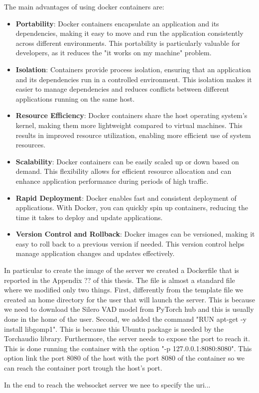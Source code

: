 \documentclass[../main.tex]{subfiles}
\begin{document}
The main advantages of using docker containers are:

\begin{itemize}
    \item \textbf{Portability}: Docker containers encapsulate an application and its dependencies, making it easy to move and run the application consistently across different environments. This portability is particularly valuable for developers, as it reduces the "it works on my machine" problem.
    \item \textbf{Isolation}: Containers provide process isolation, ensuring that an application and its dependencies run in a controlled environment. This isolation makes it easier to manage dependencies and reduces conflicts between different applications running on the same host.
    \item \textbf{Resource Efficiency}: Docker containers share the host operating system's kernel, making them more lightweight compared to virtual machines. This results in improved resource utilization, enabling more efficient use of system resources.
    \item \textbf{Scalability}: Docker containers can be easily scaled up or down based on demand. This flexibility allows for efficient resource allocation and can enhance application performance during periods of high traffic.
    \item \textbf{Rapid Deployment}: Docker enables fast and consistent deployment of applications. With Docker, you can quickly spin up containers, reducing the time it takes to deploy and update applications.
    \item \textbf{Version Control and Rollback}: Docker images can be versioned, making it easy to roll back to a previous version if needed. This version control helps manage application changes and updates effectively.
\end{itemize}

In particular to create the image of the server we created a Dockerfile that is reported in the Appendix ?? of this thesis. The file is almost a standard file where we modified only two things. First, differently from the template file we created an home directory for the user that will launch the server. This is because we need to download the Silero VAD model from PyTorch hub and this is usually done in the home of the user. Second, we added the command "RUN apt-get -y install libgomp1". This is because this Ubuntu package is needed by the Torchaudio library. Furthermore, the server needs to expose the port to reach it. This is done running the container with the option "-p 127.0.0.1:8080:8080". This option link the port 8080 of the host with the port 8080 of the container so we can reach the container port trough the host's port.

In the end to reach the websocket server we nee to specify the uri...
\end{document}
